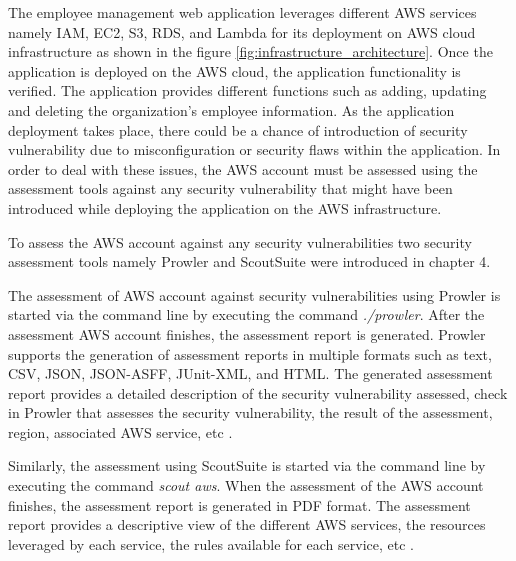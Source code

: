 \par The employee management web application \cite{78}
leverages different AWS services namely IAM, EC2, S3, RDS, and Lambda for its deployment on AWS cloud infrastructure as shown in the figure \ref{fig:infrastructure_architecture}.
Once the application is deployed on the AWS cloud, the application functionality is verified.
The application provides different functions such as adding, updating and deleting the organization’s employee information.
As the application deployment takes place, there could be a chance of introduction of security vulnerability due to misconfiguration or security flaws within the application.
In order to deal with these issues, the AWS account must be assessed using the assessment tools against any security vulnerability that might have been introduced while deploying the application on the AWS infrastructure.

\par To assess the AWS account against any security vulnerabilities two security assessment tools namely Prowler and ScoutSuite were introduced in chapter 4.

\par The assessment of AWS account against security vulnerabilities using Prowler is started via the command line by executing the command \textit{./prowler}.
After the assessment AWS account finishes, the assessment report is generated.
Prowler supports the generation of assessment reports in multiple formats such as text, CSV, JSON, JSON-ASFF, JUnit-XML, and HTML. The generated assessment report provides a detailed description of the security vulnerability assessed, check in Prowler that assesses the security vulnerability, the result of the assessment, region, associated AWS service, etc \cite{49}.


\par Similarly, the assessment using ScoutSuite is
started via the command line by executing the command
\textit{scout aws}.
When the assessment
of the AWS account finishes, the assessment report is generated in PDF format.
The assessment report provides a descriptive view of the 
different AWS services, the resources leveraged by each 
service, the rules available for each service, etc
\cite{88}.


